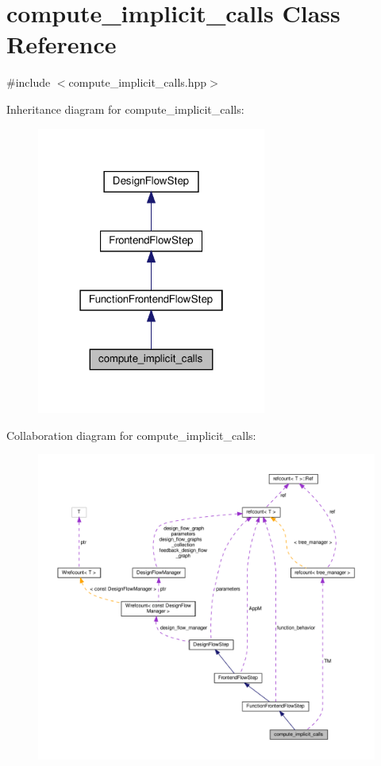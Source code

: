 \hypertarget{classcompute__implicit__calls}{}\section{compute\+\_\+implicit\+\_\+calls Class Reference}
\label{classcompute__implicit__calls}


{\ttfamily \#include $<$compute\+\_\+implicit\+\_\+calls.\+hpp$>$}



Inheritance diagram for compute\+\_\+implicit\+\_\+calls\+:
\nopagebreak
\begin{figure}[H]
\begin{center}
\leavevmode
\includegraphics[width=214pt]{d0/d05/classcompute__implicit__calls__inherit__graph}
\end{center}
\end{figure}


Collaboration diagram for compute\+\_\+implicit\+\_\+calls\+:
\nopagebreak
\begin{figure}[H]
\begin{center}
\leavevmode
\includegraphics[width=350pt]{db/d58/classcompute__implicit__calls__coll__graph}
\end{center}
\end{figure}
